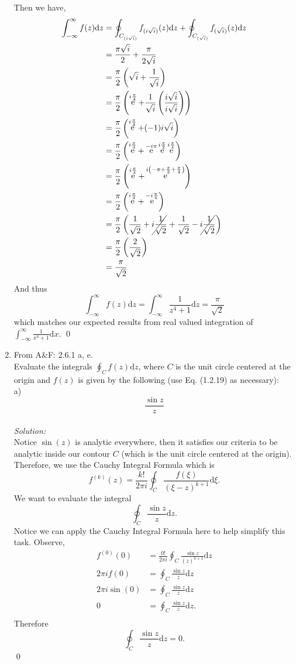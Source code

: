 \documentclass[10pt]{amsart}
\newcommand{\D}{\mathrm{d}}
\DeclareMathOperator{\E}{e}
\theoremstyle{nonumberplain}
\begin{document}
\begin{enumerate}[label={\bf {\arabic*}:}]
Then we have,
\begin{align*}
\int_{-\infty}^{\infty} f(z) \D z
	&= \oint_{C_{(i\sqrt{i})}} f_{(i\sqrt{i})}(z) \D z + \oint_{C_{(\sqrt{i})}} f_{(\sqrt{i})}(z) \D z \\
	&= \frac{\pi \sqrt{i}}{2} + \frac{\pi}{2\sqrt{i}} \\
	&= \frac{\pi}{2}\left(\sqrt{i} + \frac{1}{\sqrt{i}}\right) \\
	&= \frac{\pi}{2}\left(\E^{i\frac{\pi}{4}} + \frac{1}{\sqrt{i}} \left(\frac{i\sqrt{i}}{i\sqrt{i}}\right)\right) \\
	&= \frac{\pi}{2}\left(\E^{i\frac{\pi}{4}} + (-1) i\sqrt{i}\right) \\
	&= \frac{\pi}{2}\left(\E^{i\frac{\pi}{4}} + \E^{-i\pi} \E^{i \frac \pi 2} \E^{i \frac \pi 4}\right) \\
	&= \frac{\pi}{2}\left(\E^{i\frac{\pi}{4}} + \E^{i\left(-\pi + \frac \pi 2 + \frac \pi 4\right)}\right) \\
	&= \frac{\pi}{2}\left(\E^{i\frac{\pi}{4}} + \E^{-i \frac \pi 4}\right) \\
	&= \frac{\pi}{2}\left(\frac 1 {\sqrt{2}} + \cancel{ i\frac 1 {\sqrt{2}}} +  \frac 1 {\sqrt{2}} - \cancel{ i\frac 1 {\sqrt{2}}}\right) \\
	&= \frac{\pi}{2}\left(\frac 2 {\sqrt{2}}\right) \\
	&= \frac{\pi}{\sqrt{2}}
\end{align*}
And thus
$$
\int_{-\infty}^{\infty} f(z) \D z = \int_{-\infty}^{\infty} \frac 1 {z^4 + 1} \D z = \frac{\pi}{\sqrt{2}}
$$
which matches our expected results from real valued integration of $\int_{-\infty}^{\infty} \frac 1 {x^4 + 1} \D x$.
\qed
\\

\item From A\&F: 2.6.1 a, e.\\
Evaluate the integrals $\oint_C f(z) \D z$, where $C$ is the unit circle centered at the origin and $f(z)$ is given by the following (use Eq. (1.2.19) as necessary): \\
a)
$$
\frac{\sin z}{z}
$$
\\
\textit{Solution:}\\
Notice $\sin(z)$ is analytic everywhere, then it satisfies our criteria to be analytic inside our contour $C$ (which is the unit circle centered at the origin).
Therefore, we use the Cauchy Integral Formula which is
$$
f^{(k)}(z) = \frac{k!}{2\pi i} \oint_C \frac{f(\xi)}{\left(\xi - z\right)^{k + 1}} \D \xi.
$$
We want to evaluate the integral 
$$
\oint_C \frac{\sin z}{z} \D z.
$$
Notice we can apply the Cauchy Integral Formula here to help simplify this task.
Observe,
\begin{align*}
f^{(0)}(0) &= \frac{0!}{2\pi i} \oint_C \frac{\sin z}{(z)^{0 + 1}} \D z \\
2\pi i f(0) &= \oint_C \frac{\sin z}{z} \D z \\
2\pi i \sin(0) &= \oint_C \frac{\sin z}{z} \D z \\
0 &= \oint_C \frac{\sin z}{z} \D z. \\
\end{align*}
Therefore 
$$
\oint_C \frac{\sin z}{z} \D z = 0.
$$
\qed
\\


\end{enumerate}
\end{document}
